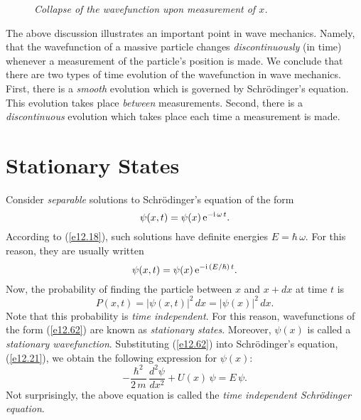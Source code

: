 \begin{figure}
\epsfysize=3.5in
\centerline{}
\caption{\em Collapse of the wavefunction upon measurement of $x$.}\label{f12.4}   
\end{figure}

The above discussion illustrates an important point in wave
mechanics. Namely, that the wavefunction of a massive particle
changes {\em discontinuously}\/ (in time) whenever a measurement of the particle's position is made. We conclude that there are two types of time
evolution of the wavefunction in wave mechanics. First, there is a {\em smooth}\/ evolution which is governed
by Schr\"{o}dinger's equation. This evolution takes place {\em between}\/ measurements. Second, there is a {\em discontinuous}\/ evolution which
takes place each time a measurement is made.

\section{Stationary States}
Consider {\em separable}\/ solutions to Schr\"{o}dinger's equation of the form
\begin{equation}
\psi(x,t) = \psi(x)\,{\rm e}^{-{\rm i}\,\omega\,t}.
\end{equation}
According to (\ref{e12.18}),  such solutions have definite energies $E=\hbar\,\omega$. For this reason,
they are usually written
\begin{equation}\label{e12.62}
\psi(x,t) = \psi(x)\,{\rm e}^{-{\rm i}\,(E/\hbar)\,t}.
\end{equation}
Now, the probability of finding the particle between $x$ and $x+dx$ at time $t$ is
\begin{equation}
P(x,t) = |\psi(x,t)|^2\,dx = |\psi(x)|^2\,dx.
\end{equation}
Note that this probability is {\em time independent}. For this reason, wavefunctions of the
form (\ref{e12.62}) are known as {\em stationary states}. Moreover, $\psi(x)$ is called a {\em stationary
wavefunction}. Substituting  (\ref{e12.62}) into Schr\"{o}dinger's equation, (\ref{e12.21}), we
obtain the following expression for $\psi(x)$:
\begin{equation}\label{e12.64}
-\frac{\hbar^2}{2\,m}\,\frac{d^2\psi}{d x^2} + U(x)\,\psi = E\,\psi.
\end{equation}
Not surprisingly, the above equation is called  the {\em time independent Schr\"{o}d\-inger equation}. 

